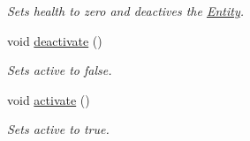 \begin{DoxyCompactItemize}
\begin{DoxyCompactList}\small\item\em Sets health to zero and deactives the \hyperlink{classEntity}{Entity}. \end{DoxyCompactList}\item 
void \hyperlink{classEntity_aa409e70e0f5abb2ac1314f8745b9a661}{deactivate} ()\hypertarget{classEntity_aa409e70e0f5abb2ac1314f8745b9a661}{}\label{classEntity_aa409e70e0f5abb2ac1314f8745b9a661}

\begin{DoxyCompactList}\small\item\em Sets active to false. \end{DoxyCompactList}\item 
void \hyperlink{classEntity_a95079be1c9fa9f109dd3cf7446eeeb1d}{activate} ()\hypertarget{classEntity_a95079be1c9fa9f109dd3cf7446eeeb1d}{}\label{classEntity_a95079be1c9fa9f109dd3cf7446eeeb1d}

\begin{DoxyCompactList}\small\item\em Sets active to true. \end{DoxyCompactList}\end{DoxyCompactItemize}
